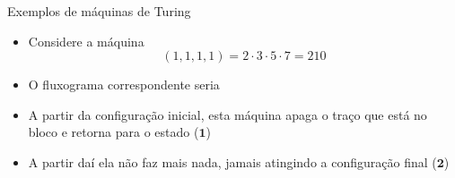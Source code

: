 \begin{frame}[fragile]{Exemplos de máquinas de Turing}

    \begin{itemize}
        \item Considere a máquina 
        \[
            (1, 1, 1, 1) = 2\cdot 3\cdot 5\cdot 7 = 210
        \]

        \item O fluxograma correspondente seria

    \begin{figure}[h]
        \centering
    \end{figure}


        \item A partir da configuração inicial, esta máquina apaga o traço que está no bloco e
            retorna para o estado ($\mathbf{1}$)

        \item A partir daí ela não faz mais nada, jamais atingindo a configuração final 
            ($\mathbf{2}$)
    \end{itemize}

\end{frame}

